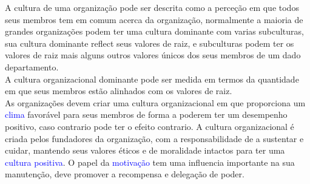 A cultura de uma organização pode ser descrita como a perceção em que todos seus membros tem em comum acerca da organização, normalmente a maioria de grandes organizações podem ter uma cultura dominante com varias subculturas, sua cultura dominante reflect seus valores de raiz, e subculturas podem ter os valores de raiz mais alguns outros valores únicos dos seus membros de um dado departamento. \\
A cultura organizacional dominante pode ser medida em termos da quantidade em que seus membros estão alinhados com os valores de raiz. \\
As organizações devem criar uma cultura organizacional em que proporciona um \textcolor{blue}{clima} favorável para seus membros de forma a poderem ter um desempenho positivo, caso contrario pode ter o efeito contrario. A cultura organizacional é criada pelos fundadores da organização, com a responsabilidade de a sustentar e cuidar, mantendo seus valores éticos e de moralidade intactos para ter uma \textcolor{blue}{cultura positiva}. O papel da \textcolor{blue}{motivação} tem uma influencia importante na sua manutenção, deve promover a recompensa e delegação de poder.\cite{book_4} \cite{book_2}
\newpage
